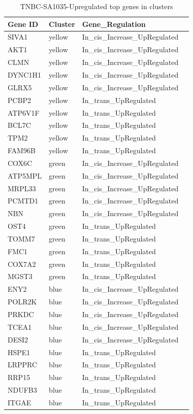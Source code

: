  \begin{table}[htbp]
   \centering
   \caption{TNBC-SA1035-Upregulated top genes in clusters}
     \begin{tabular}{|l|l|l|r}
        \hline
     Gene ID & Cluster & Gene\_Regulation   \\
        \hline
     SIVA1 & yellow & In\_cis\_Increase\_UpRegulated   \\
     AKT1 & yellow & In\_cis\_Increase\_UpRegulated   \\
     CLMN & yellow & In\_cis\_Increase\_UpRegulated  \\
     DYNC1H1 & yellow & In\_cis\_Increase\_UpRegulated   \\
     GLRX5 & yellow & In\_cis\_Increase\_UpRegulated   \\
     PCBP2 & yellow & In\_trans\_UpRegulated   \\
     ATP6V1F & yellow & In\_trans\_UpRegulated   \\
     BCL7C & yellow & In\_trans\_UpRegulated   \\
     TPM2 & yellow & In\_trans\_UpRegulated   \\
     FAM96B & yellow & In\_trans\_UpRegulated   \\
     COX6C & green & In\_cis\_Increase\_UpRegulated   \\
     ATP5MPL & green & In\_cis\_Increase\_UpRegulated   \\
     MRPL33 & green & In\_cis\_Increase\_UpRegulated   \\
     PCMTD1 & green & In\_cis\_Increase\_UpRegulated   \\
     NBN & green & In\_cis\_Increase\_UpRegulated   \\
     OST4 & green & In\_trans\_UpRegulated   \\
     TOMM7 & green & In\_trans\_UpRegulated   \\
     FMC1 & green & In\_trans\_UpRegulated   \\
     COX7A2 & green & In\_trans\_UpRegulated   \\
     MGST3 & green & In\_trans\_UpRegulated   \\
     ENY2 & blue & In\_cis\_Increase\_UpRegulated   \\
     POLR2K & blue & In\_cis\_Increase\_UpRegulated   \\
     PRKDC & blue & In\_cis\_Increase\_UpRegulated   \\
     TCEA1 & blue & In\_cis\_Increase\_UpRegulated   \\
     DESI2 & blue & In\_cis\_Increase\_UpRegulated   \\
     HSPE1 & blue & In\_trans\_UpRegulated   \\
     LRPPRC & blue & In\_trans\_UpRegulated   \\
     RRP15 & blue & In\_trans\_UpRegulated   \\
     NDUFB3 & blue & In\_trans\_UpRegulated   \\
     ITGAE & blue & In\_trans\_UpRegulated   \\
     \hline
     \end{tabular}%
   \label{tab:SA1035upregulatedgenesinclusters}%
 \end{table}%
